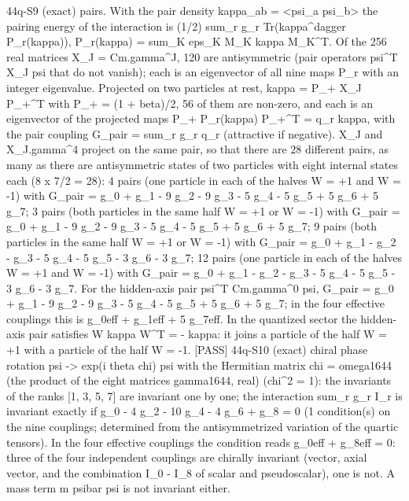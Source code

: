 \documentclass[
  10pt,
]{article}
\newenvironment{Shaded}{}{}
\newcommand{\NormalTok}[1]{#1}
\begin{document}
\begin{Shaded}
\begin{Highlighting}[]
\NormalTok{[PASS] 44q{-}S9  (exact) pairs. With the pair density kappa\_ab = \textless{}psi\_a psi\_b\textgreater{} the pairing energy of the interaction is (1/2) sum\_r g\_r Tr(kappa\^{}dagger P\_r(kappa)), P\_r(kappa) = sum\_K eps\_K M\_K kappa M\_K\^{}T. Of the 256 real matrices X\_J = Cm.gamma\^{}J, 120 are antisymmetric (pair operators psi\^{}T X\_J psi that do not vanish); each is an eigenvector of all nine maps P\_r with an integer eigenvalue. Projected on two particles at rest, kappa = P\_+ X\_J P\_+\^{}T with P\_+ = (1 + beta)/2, 56 of them are non{-}zero, and each is an eigenvector of the projected maps P\_+ P\_r(kappa) P\_+\^{}T = q\_r kappa, with the pair coupling G\_pair = sum\_r g\_r q\_r (attractive if negative). X\_J and X\_J.gamma\^{}4 project on the same pair, so that there are 28 different pairs, as many as there are antisymmetric states of two particles with eight internal states each (8 x 7/2 = 28): 4 pairs (one particle in each of the halves W = +1 and W = {-}1) with G\_pair = g\_0 + g\_1 {-} 9 g\_2 {-} 9 g\_3 {-} 5 g\_4 {-} 5 g\_5 + 5 g\_6 + 5 g\_7; 3 pairs (both particles in the same half W = +1 or W = {-}1) with G\_pair = g\_0 + g\_1 {-} 9 g\_2 {-} 9 g\_3 {-} 5 g\_4 {-} 5 g\_5 + 5 g\_6 + 5 g\_7; 9 pairs (both particles in the same half W = +1 or W = {-}1) with G\_pair = g\_0 + g\_1 {-} g\_2 {-} g\_3 {-} 5 g\_4 {-} 5 g\_5 {-} 3 g\_6 {-} 3 g\_7; 12 pairs (one particle in each of the halves W = +1 and W = {-}1) with G\_pair = g\_0 + g\_1 {-} g\_2 {-} g\_3 {-} 5 g\_4 {-} 5 g\_5 {-} 3 g\_6 {-} 3 g\_7. For the hidden{-}axis pair psi\^{}T Cm.gamma\^{}0 psi, G\_pair = g\_0 + g\_1 {-} 9 g\_2 {-} 9 g\_3 {-} 5 g\_4 {-} 5 g\_5 + 5 g\_6 + 5 g\_7; in the four effective couplings this is g\_0eff + g\_1eff + 5 g\_7eff. In the quantized sector the hidden{-}axis pair satisfies W kappa W\^{}T = {-} kappa: it joins a particle of the half W = +1 with a particle of the half W = {-}1.}
\NormalTok{[PASS] 44q{-}S10  (exact) chiral phase rotation psi {-}\textgreater{} exp(i theta chi) psi with the Hermitian matrix chi = omega1644 (the product of the eight matrices gamma1644, real) (chi\^{}2 = 1): the invariants of the ranks [1, 3, 5, 7] are invariant one by one; the interaction sum\_r g\_r I\_r is invariant exactly if g\_0 {-} 4 g\_2 {-} 10 g\_4 {-} 4 g\_6 + g\_8 = 0 (1 condition(s) on the nine couplings; determined from the antisymmetrized variation of the quartic tensors). In the four effective couplings the condition reads g\_0eff + g\_8eff = 0: three of the four independent couplings are chirally invariant (vector, axial vector, and the combination I\_0 {-} I\_8 of scalar and pseudoscalar), one is not. A mass term m psibar psi is not invariant either.}

\end{Highlighting}
\end{Shaded}
\end{document}
